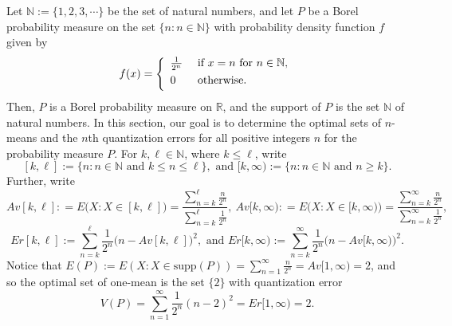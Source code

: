 \documentclass[12pt, reqno]{amsart}
\theoremstyle{plain}
\theoremstyle{definition}
\newcommand{\set}[1]{\{#1\}}%
\newcommand{\D}[1]{\mathbb{#1}}%
\newcommand{\te}{\text}%
\begin{document}
Let $\D N:=\set{1, 2, 3, \cdots}$ be the set of natural numbers, and let $P$ be a Borel probability measure on the set $\set{n : n \in \D N}$ with probability density function $f$ given by
\[f(x)=\left\{\begin{array} {ll} \vspace {0.05 in} 
\frac 1{2^n} & \te{ if } x =n \te { for } n\in \D N,\\ \vspace {0.05 in}
0 &  \te{ otherwise}.
\end{array}
\right.\]
Then, $P$ is a Borel probability measure on $\D R$, and the support of $P$ is the set $\D N$ of natural numbers.  In this section, our goal is to determine the optimal sets of $n$-means and the $n$th quantization errors for all positive integers $n$ for the probability measure $P$. For $k, \ell\in \D N$, where $k\leq \ell$, write
\[[k, \ell]:=\set{n : n \in \D N \te{ and } k\leq n\leq \ell}, \te{ and } [k, \infty):=\set{n : n\in \D N \te{ and } n\geq k}.\]
Further, write
\[Av[k, \ell]: =E\Big (X : X \in [k, \ell]\Big)=\frac{\sum _{n=k}^{\ell} \frac{n}{2^n}}{\sum_{n=k}^{\ell}\frac{1}{2^n}}, \  Av[k, \infty): =E\Big (X : X \in [k, \infty)\Big)=\frac{\sum _{n=k}^{\infty} \frac{n}{2^n}}{\sum_{n=k}^{\infty}\frac{1}{2^n}},\]
\[Er[k, \ell]:=\sum _{n=k}^{\ell} \frac{1}{2^n} \Big(n-Av[k, \ell]\Big)^2, \te{ and } Er[k, \infty):=\sum _{n=k}^{\infty} \frac{1}{2^n} \Big(n-Av[k,\infty)\Big)^2.\]
 Notice that
$E(P):=E(X : X \in \te{supp}(P)) =\sum _{n=1}^\infty \frac n{2^n}  =Av[1, \infty)=2$, and so the optimal set of one-mean is the set $\set{2}$ with quantization error
\[V(P)=\sum _{n=1}^{\infty} \frac 1 {2^n} (n-2)^2=Er[1, \infty) =2.\]
\end{document}
